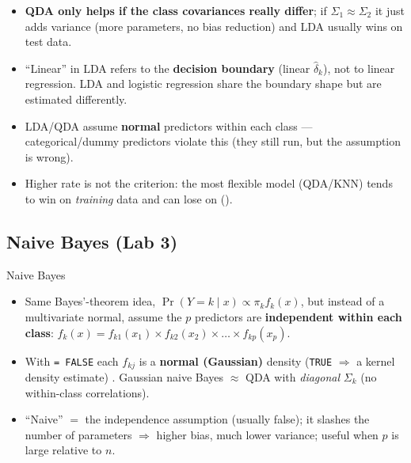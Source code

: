 \begin{trap}
\begin{itemize}
\item \textbf{QDA only helps if the class covariances really differ}; if $\Sigma_1\approx\Sigma_2$ it just adds
  variance (more parameters, no bias reduction) and LDA usually wins on test data.
\item ``Linear'' in LDA refers to the \textbf{decision boundary} (linear $\hat\delta_k$), not to linear regression.
  LDA and logistic regression share the boundary shape but are estimated differently.
\item LDA/QDA assume \textbf{normal} predictors within each class --- categorical/dummy predictors violate this
  (they still run, but the assumption is wrong).
\item Higher  rate is not the criterion: the most flexible model (QDA/KNN) tends to win on
  \emph{training} data and can lose on  ().
\end{itemize}
\end{trap}

\subsection{Naive Bayes (Lab 3)}

\begin{topic}{Naive Bayes}
\begin{itemize}
\item Same Bayes'-theorem idea, $\Pr(Y=k\mid x)\propto\pi_kf_k(x)$, but instead of a multivariate normal,
  assume the $p$ predictors are \textbf{independent within each class}:
  $f_k(x)=f_{k1}(x_1)\times f_{k2}(x_2)\times\dots\times f_{kp}(x_p)$.
\item With  \texttt{= FALSE} each $f_{kj}$ is a \textbf{normal (Gaussian)} density
  (\texttt{TRUE} $\Rightarrow$ a kernel density estimate) . Gaussian naive Bayes $\approx$ QDA with
  \emph{diagonal} $\Sigma_k$ (no within-class correlations).
\item ``Naive'' $=$ the independence assumption (usually false); it slashes the number of parameters
  $\Rightarrow$ higher bias, much lower variance; useful when $p$ is large relative to $n$.
\end{itemize}
\end{topic}

